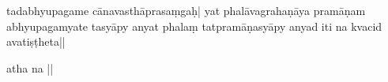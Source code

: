 tadabhyupagame cānavasthāprasaṃgaḥ| 
yat phalāvagrahaṇāya pramāṇam abhyupagamyate tasyāpy anyat phalaṃ tatpramāṇasyāpy anyad iti na kvacid avatiṣṭheta||

atha na 
||

